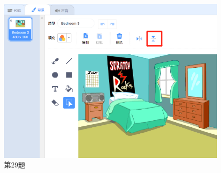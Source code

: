 \documentclass[10pt, a4paper]{article}
\begin{document}
\begin{enumerate}
        \begin{figure}[htbp]
            \centering
            \begin{minipage}[t]{.25\textwidth}
                \centering
                \includegraphics[width=\textwidth]{29.png}
                \caption*{第29题}
            \end{minipage}
            \begin{minipage}[t]{.18\textwidth}
                \centering
                \begin{minipage}[t]{.35\textwidth}
                    \centering

\end{minipage}
\end{minipage}
\end{figure}
\end{enumerate}
\end{document}
